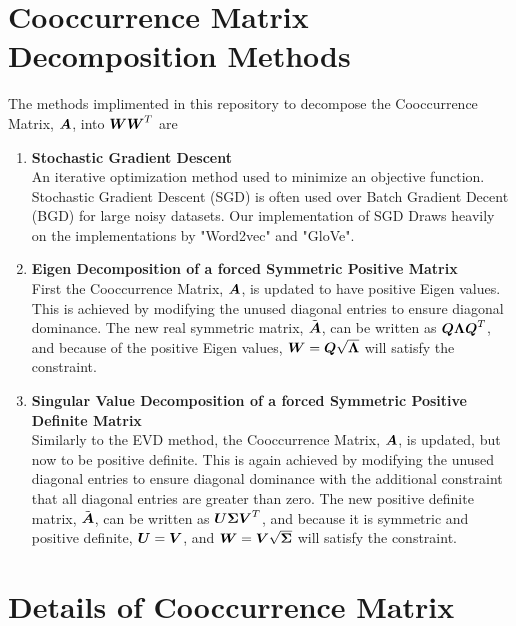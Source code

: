 \documentclass{article}
\begin{document}
%
%

\section{Cooccurrence Matrix Decomposition Methods}
	The methods implimented in this repository to decompose the Cooccurrence Matrix, $\boldsymbol{A}$, into $\boldsymbol{W}\boldsymbol{W}^T$ are
	\begin{enumerate}
		\item \textbf{Stochastic Gradient Descent}\\
			An iterative optimization method used to minimize an objective function. Stochastic Gradient Descent (SGD) is often used over Batch Gradient Decent (BGD) for large noisy datasets.
			Our implementation of SGD Draws heavily on the implementations by "Word2vec" and "GloVe".
			
		\item \textbf{Eigen Decomposition of a forced Symmetric Positive Matrix}\\
			First the Cooccurrence Matrix, $\boldsymbol{A}$, is updated to have positive Eigen values. This is achieved by modifying the unused diagonal entries to ensure diagonal dominance. The new real symmetric matrix, $\tilde{\boldsymbol{A}}$, can be written as $\boldsymbol{Q}\boldsymbol{\Lambda}\boldsymbol{Q}^T$, and because of the positive Eigen values, $\boldsymbol{W} = \boldsymbol{Q} \sqrt{\boldsymbol{\Lambda}}$ will satisfy the constraint.
			
		\item \textbf{Singular Value Decomposition of a forced Symmetric Positive Definite Matrix}\\
			Similarly to the EVD method, the Cooccurrence Matrix, $\boldsymbol{A}$, is updated, but now to be positive definite. This is again achieved by modifying the unused diagonal entries to ensure diagonal dominance with the additional constraint that all diagonal entries are greater than zero. The new positive definite matrix, $\tilde{\boldsymbol{A}}$, can be written as $\boldsymbol{U}\boldsymbol{\Sigma}\boldsymbol{V}^T$, and because it is symmetric and positive definite, $\boldsymbol{U} = \boldsymbol{V}$, and  $\boldsymbol{W} = \boldsymbol{V} \sqrt{\boldsymbol{\Sigma}}$ will satisfy the constraint.
	\end{enumerate}

%
%

\section{Details of Cooccurrence Matrix}
\end{document}
